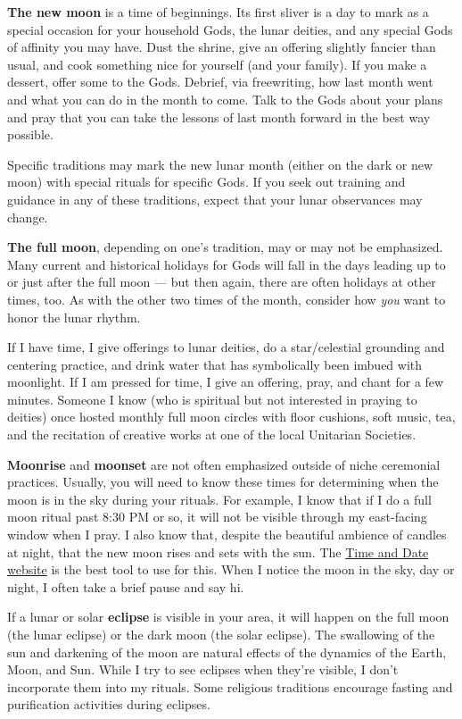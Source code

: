 \documentclass[
]{book}
\begin{document}
\textbf{The new moon} is a time of beginnings. Its first sliver is a day to mark as a special occasion for your household Gods, the lunar deities, and any special Gods of affinity you may have. Dust the shrine, give an offering slightly fancier than usual, and cook something nice for yourself (and your family). If you make a dessert, offer some to the Gods. Debrief, via freewriting, how last month went and what you can do in the month to come. Talk to the Gods about your plans and pray that you can take the lessons of last month forward in the best way possible.

Specific traditions may mark the new lunar month (either on the dark or new moon) with special rituals for specific Gods. If you seek out training and guidance in any of these traditions, expect that your lunar observances may change.

\textbf{The full moon}, depending on one's tradition, may or may not be emphasized. Many current and historical holidays for Gods will fall in the days leading up to or just after the full moon --- but then again, there are often holidays at other times, too. As with the other two times of the month, consider how \emph{you} want to honor the lunar rhythm.

If I have time, I give offerings to lunar deities, do a star/celestial grounding and centering practice, and drink water that has symbolically been imbued with moonlight. If I am pressed for time, I give an offering, pray, and chant for a few minutes. Someone I know (who is spiritual but not interested in praying to deities) once hosted monthly full moon circles with floor cushions, soft music, tea, and the recitation of creative works at one of the local Unitarian Societies.

\textbf{Moonrise} and \textbf{moonset} are not often emphasized outside of niche ceremonial practices. Usually, you will need to know these times for determining when the moon is in the sky during your rituals. For example, I know that if I do a full moon ritual past 8:30 PM or so, it will not be visible through my east-facing window when I pray. I also know that, despite the beautiful ambience of candles at night, that the new moon rises and sets with the sun. The \href{https://www.timeanddate.com/moon/}{Time and Date website} is the best tool to use for this. When I notice the moon in the sky, day or night, I often take a brief pause and say hi.

If a lunar or solar \textbf{eclipse} is visible in your area, it will happen on the full moon (the lunar eclipse) or the dark moon (the solar eclipse). The swallowing of the sun and darkening of the moon are natural effects of the dynamics of the Earth, Moon, and Sun. While I try to see eclipses when they're visible, I don't incorporate them into my rituals. Some religious traditions encourage fasting and purification activities during eclipses.
\end{document}
